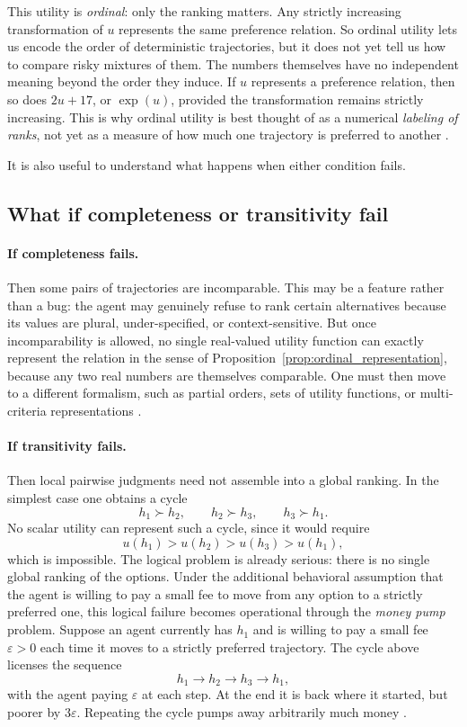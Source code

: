 \documentclass[11pt]{article}
\newcommand{\strictpref}{\succ}
\begin{document}
This utility is \emph{ordinal}: only the ranking matters. Any strictly
increasing transformation of $u$ represents the same preference relation. So
ordinal utility lets us encode the order of deterministic trajectories, but it
does not yet tell us how to compare risky mixtures of them. The numbers
themselves have no independent meaning beyond the order they induce. If $u$
represents a preference relation, then so does $2u+17$, or $\exp(u)$, provided
the transformation remains strictly increasing. This is why ordinal utility is
best thought of as a numerical \emph{labeling of ranks}, not yet as a measure of
how much one trajectory is preferred to another \citep{fishburn1970utility}.

It is also useful to understand what happens when either condition fails.

\subsection*{What if completeness or transitivity fail}

\paragraph{If completeness fails.}
Then some pairs of trajectories are incomparable. This may be a feature rather
than a bug: the agent may genuinely refuse to rank certain alternatives because
its values are plural, under-specified, or context-sensitive. But once
incomparability is allowed, no single real-valued utility function can exactly
represent the relation in the sense of
Proposition~\ref{prop:ordinal_representation}, because any two real numbers are
themselves comparable. One must then move to a different formalism, such as
partial orders, sets of utility functions, or multi-criteria representations
\citep{aumann1962utility}.

\paragraph{If transitivity fails.}
Then local pairwise judgments need not assemble into a global ranking. In the
simplest case one obtains a cycle
\[
h_1 \strictpref h_2,\qquad h_2 \strictpref h_3,\qquad h_3 \strictpref h_1.
\]
No scalar utility can represent such a cycle, since it would require
\[
u(h_1)>u(h_2)>u(h_3)>u(h_1),
\]
which is impossible.
The logical problem is already serious: there is no single global ranking of the
options. Under the additional behavioral assumption that the agent is willing to
pay a small fee to move from any option to a strictly preferred one, this
logical failure becomes operational through the \emph{money pump} problem.
Suppose an agent currently has $h_1$ and is willing to pay a small fee
$\varepsilon>0$ each time it moves to a strictly preferred trajectory. The
cycle above licenses the sequence
\[
h_1 \to h_2 \to h_3 \to h_1,
\]
with the agent paying $\varepsilon$ at each step. At the end it is back where
it started, but poorer by $3\varepsilon$. Repeating the cycle pumps away
arbitrarily much money \citep{gustafsson2010money}.
\end{document}
